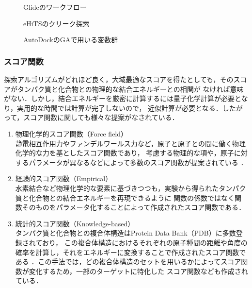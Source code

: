 \begin{figure}[htb]
 \begin{center}
  \caption{Glideのワークフロー\cite{Friesner2004}}
  \label{fig:glide_flowchart}
 \end{center}
\end{figure}
\begin{figure}[htb]
 \begin{center}
  \caption{eHiTSのクリーク探索}
  \label{fig:eHiTS_clique}
 \end{center}
\end{figure}
\begin{figure}[htb]
 \begin{center}
  \caption{AutoDockのGAで用いる変数群}
  \label{fig:AutoDock_gene}
 \end{center}
\end{figure}


\subsubsection{スコア関数}
探索アルゴリズムがどれほど良く，大域最適なスコアを得たとしても，そのスコアがタンパク質と化合物との物理的な結合エネルギーとの相関が
なければ意味がない．しかし，結合エネルギーを厳密に計算するには量子化学計算が必要となり，実用的な時間では計算が完了しないので，
近似計算が必要となる．したがって，スコア関数に関しても様々な提案がなされている．
\begin{enumerate}
\item 物理化学的スコア関数（Force field）\\
	静電相互作用力やファンデルワールス力など，原子と原子との間に働く物理化学的な力を基としたスコア関数であり，
	考慮する物理的な項や，原子に対するパラメータが異なるなどによって多数のスコア関数が提案されている
	\cite{Morris1998, Ewing2001, Jones1997}．
\item 経験的スコア関数（Empirical）\\
	水素結合など物理化学的な要素に基づきつつも，実験から得られたタンパク質と化合物との結合エネルギーを再現できるように
	関数の係数ではなく関数そのものをパラメータ化することによって作成されたスコア関数である\cite{Wang2002, Gehlhaar1995, Eldridge1997}．
\item 統計的スコア関数（Knowledge-based）\\
	タンパク質と化合物との複合体構造はProtein Data Bank（PDB）\cite{Berman2000}に多数登録されており，
	この複合体構造におけるそれぞれの原子種間の距離や角度の確率を計算し，それをエネルギーに変換することで作成されたスコア関数である
	\cite{Muegge2006, Xue2010, Gohlke2000, Huang2010}．この手法では，どの複合体構造のセットを用いるかによってスコア関数が変化するため，一部のターゲットに特化した
	スコア関数なども作成されている\cite{Seifert2009}．
\end{enumerate}

